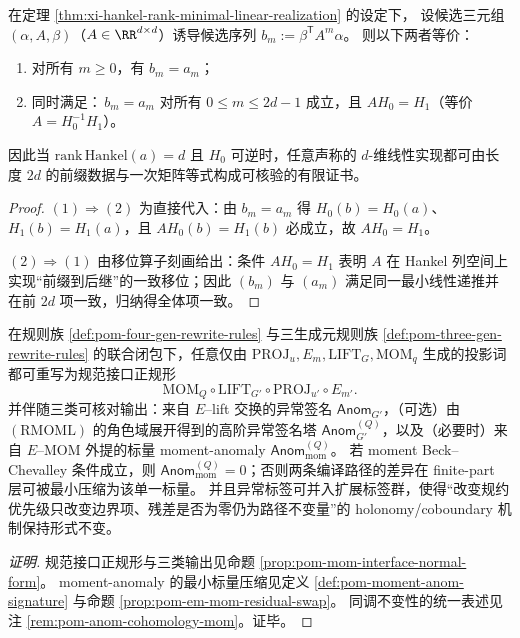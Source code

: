 \begin{proposition}\label{prop:xi-hankel-finite-certificate-principle}
在定理 \ref{thm:xi-hankel-rank-minimal-linear-realization} 的设定下，
设候选三元组 \((\alpha,A,\beta)\)（\(A\in\RR^{d\times d}\)）诱导候选序列 \(b_m:=\beta^{\mathsf T}A^{m}\alpha\)。
则以下两者等价：
\begin{enumerate}
  \item 对所有 \(m\ge 0\)，有 \(b_m=a_m\)；
  \item 同时满足：\(\,b_m=a_m\) 对所有 \(0\le m\le 2d-1\) 成立，且 \(AH_0=H_1\)（等价 \(A=H_0^{-1}H_1\)）。
\end{enumerate}
因此当 \(\mathrm{rank}\,\mathrm{Hankel}(a)=d\) 且 \(H_0\) 可逆时，任意声称的 \(d\)-维线性实现都可由长度 \(2d\) 的前缀数据与一次矩阵等式构成可核验的有限证书。
\end{proposition}
\begin{proof}
\((1)\Rightarrow(2)\) 为直接代入：由 \(b_m=a_m\) 得 \(H_0(b)=H_0(a)\)、\(H_1(b)=H_1(a)\)，且 \(AH_0(b)=H_1(b)\) 必成立，故 \(AH_0=H_1\)。
\par
\((2)\Rightarrow(1)\) 由移位算子刻画给出：条件 \(AH_0=H_1\) 表明 \(A\) 在 Hankel 列空间上实现“前缀到后继”的一致移位；因此 \((b_m)\) 与 \((a_m)\) 满足同一最小线性递推并在前 \(2d\) 项一致，归纳得全体项一致。
\end{proof}

\begin{conclusion}\label{con:xi-terminal-projword-normal-form-mom-twist-anom}
在规则族 \ref{def:pom-four-gen-rewrite-rules} 与三生成元规则族 \ref{def:pom-three-gen-rewrite-rules} 的联合闭包下，任意仅由
\(\mathrm{PROJ}_u,E_m,\mathrm{LIFT}_G,\mathrm{MOM}_q\)
生成的投影词都可重写为规范接口正规形
\[
\mathrm{MOM}_Q\circ \mathrm{LIFT}_{G'}\circ \mathrm{PROJ}_{u'}\circ E_{m'}.
\]
并伴随三类可核对输出：来自 \(E\)--lift 交换的异常签名 \(\mathsf{Anom}_{G'}\)，（可选）由 \((\mathrm{RMOML})\) 的角色域展开得到的高阶异常签名塔 \(\mathsf{Anom}^{(Q)}_{G'}\)，以及（必要时）来自 \(E\)--\(\mathrm{MOM}\) 外提的标量 moment-anomaly \(\mathsf{Anom}^{(Q)}_{\mathrm{mom}}\)。
若 moment Beck--Chevalley 条件成立，则 \(\mathsf{Anom}^{(Q)}_{\mathrm{mom}}=0\)；否则两条编译路径的差异在 finite-part 层可被最小压缩为该单一标量。
并且异常标签可并入扩展标签群，使得“改变规约优先级只改变边界项、残差是否为零仍为路径不变量”的 holonomy/coboundary 机制保持形式不变。
\end{conclusion}
\begin{proof}[证明]
规范接口正规形与三类输出见命题 \ref{prop:pom-mom-interface-normal-form}。
moment-anomaly 的最小标量压缩见定义 \ref{def:pom-moment-anom-signature} 与命题 \ref{prop:pom-em-mom-residual-swap}。
同调不变性的统一表述见注 \ref{rem:pom-anom-cohomology-mom}。证毕。
\end{proof}

